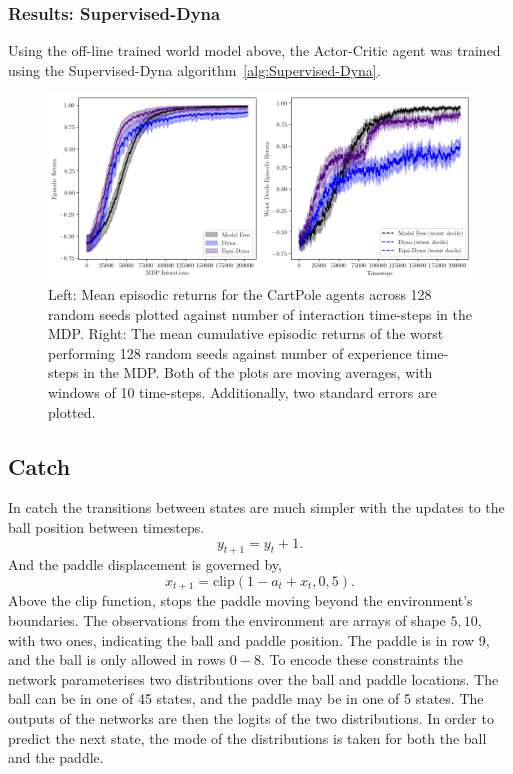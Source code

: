 \subsubsection{Results: Supervised-Dyna}
Using the off-line trained world model above, the Actor-Critic agent was trained using the Supervised-Dyna algorithm~\ref{alg:Supervised-Dyna}.
\begin{figure}
	\centering
	\includegraphics[width=\textwidth]{Figures/Expert_Dyna_Catch_pr4.png}
	\caption{Left: Mean episodic returns for the CartPole agents across 128 random seeds
		plotted against number of interaction time-steps in the MDP. Right: The mean
		cumulative episodic returns of the worst performing 128 random seeds against
		number of experience time-steps in the MDP. Both of the plots are moving
		averages, with windows of 10 time-steps. Additionally, two standard errors are
		plotted.}
	\label{fig:supervised-dyna-cp}
\end{figure}



\subsection{Catch}
In catch the transitions between states are much simpler with the updates to the ball position between timesteps.
\begin{equation}
	y_{t+1} = y_t + 1.
\end{equation}
And the paddle displacement is governed by,
\begin{equation}
	x_{t+1} = \text{clip}(1- a_t + x_t, 0, 5).
\end{equation}
Above the clip function, stops the paddle moving beyond the environment's boundaries. The observations from the environment are arrays of shape $5 , 10$, with two ones, indicating the ball and paddle position. The paddle is in row 9, and the ball is only allowed in rows $0 -8$. To encode these constraints the network parameterises two distributions over the ball and paddle locations. The ball can be in one of 45 states, and the paddle may be in one of 5 states. The outputs of the networks are then the logits of the two distributions. In order to predict the next state, the mode of the distributions is taken for both the ball and the paddle.

